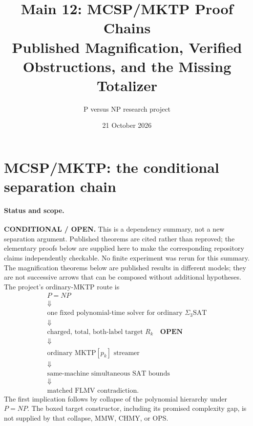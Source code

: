 \documentclass[11pt]{article}
\title{Main 12: MCSP/MKTP Proof Chains\\
\large Published Magnification, Verified Obstructions, and the Missing Totalizer}
\author{P versus NP research project}
\date{21 October 2026}
\begin{document}
\maketitle
\begin{center}
\end{center}

\section{MCSP/MKTP: the conditional separation chain}

\paragraph{Status and scope.}
\textbf{CONDITIONAL / OPEN.} This is a dependency summary, not a new
separation argument. Published theorems are cited rather than reproved; the
elementary proofs below are supplied here to make the corresponding
repository claims independently checkable. No finite experiment was rerun
for this summary. The magnification theorems below are published results
in different models; they are not successive arrows that can be composed
without additional hypotheses. The project's ordinary-MKTP route is
\[
\begin{array}{c}
 P=NP\\
 \Downarrow\\
 \text{one fixed polynomial-time solver for ordinary }\Sigma_3\mathrm{SAT}\\
 \Downarrow\\
 \boxed{\text{charged, total, both-label target }R_k\quad\textbf{OPEN}}\\
 \Downarrow\\
 \text{ordinary }\mathrm{MKTP}[p_k]\text{ streamer}\\
 \Downarrow\\
 \text{same-machine simultaneous SAT bounds}\\
 \Downarrow\\
 \text{matched FLMV contradiction.}
\end{array}
\]
The first implication follows by collapse of the polynomial hierarchy under
$P=NP$. The boxed target constructor, including its promised complexity
gap, is not supplied by that collapse, MMW, CHMY, or OPS.
\end{document}
